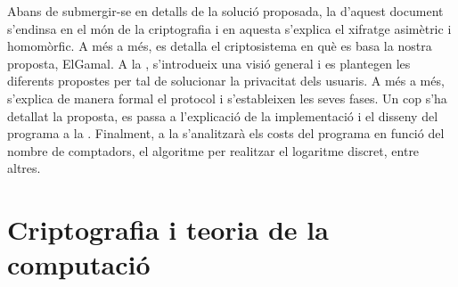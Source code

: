 \documentclass{article}
\begin{document}
Abans de submergir-se en detalls de la solució proposada, la  d'aquest document s'endinsa en el món de la criptografia i en aquesta s'explica el xifratge asimètric i homomòrfic. A més a més, es detalla el criptosistema en què es basa la nostra proposta, ElGamal. A la ,  s'introdueix una visió general i es plantegen les diferents propostes per tal de solucionar la privacitat dels usuaris. A més a més, s'explica de manera formal el protocol i s'estableixen les seves fases. Un cop s'ha detallat la proposta, es passa a l'explicació de la implementació i el disseny del programa a la . Finalment, a la  s'analitzarà els costs del programa en funció del nombre de comptadors, el algoritme per realitzar el logaritme discret, entre altres.
\newpage\part{Criptografia i teoria de la computació}\label{part:criptografia}
\end{document}
